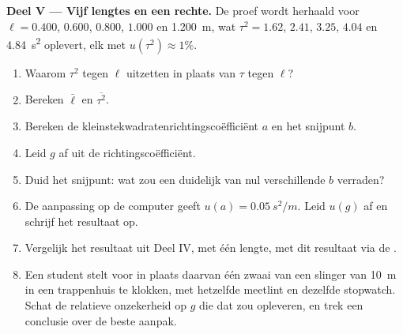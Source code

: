 \begin{problem}
\medskip
\noindent\textbf{Deel V --- Vijf lengtes en een rechte.}
De proef wordt herhaald voor $\ell = 0.400$, $0.600$, $0.800$,
$1.000$ en \qty{1.200}{m}, wat $\tau^2 = 1.62$, $2.41$, $3.25$,
$4.04$ en \qty{4.84}{s^2} oplevert, elk met $u(\tau^2) \approx 1\%$.
\begin{enumerate}[resume]
  \item Waarom $\tau^2$ tegen $\ell$ uitzetten in plaats van $\tau$ tegen
        $\ell$?
  \item Bereken $\bar\ell$ en $\overline{\tau^2}$.
  \item Bereken de kleinstekwadratenrichtingscoëfficiënt $a$ en het snijpunt $b$.
  \item Leid $g$ af uit de richtingscoëfficiënt.
  \item Duid het snijpunt: wat zou een duidelijk van nul verschillende $b$
        verraden?
  \item De aanpassing op de computer geeft $u(a) = \qty{0.05}{s^2/m}$. Leid
        $u(g)$ af en schrijf het resultaat op.
  \item Vergelijk het resultaat uit Deel IV, met één lengte, met dit
        resultaat via de .
  \item Een student stelt voor in plaats daarvan één zwaai van een slinger
        van \qty{10}{m} in een trappenhuis te klokken, met hetzelfde
        meetlint en dezelfde stopwatch. Schat de relatieve onzekerheid op
        $g$ die dat zou opleveren, en trek een conclusie over de beste
        aanpak.
\end{enumerate}
\end{problem}
